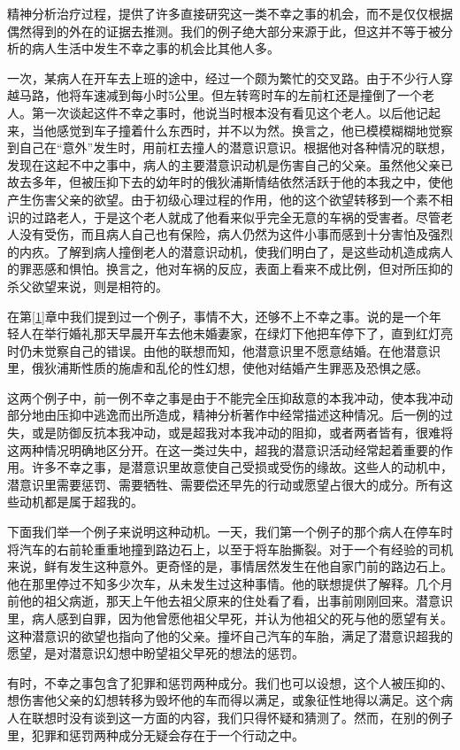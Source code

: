 \documentclass[UTF8,10pt,a4paper,openany]{book}
\begin{document}
精神分析治疗过程，提供了许多直接研究这一类不幸之事的机会，而不是仅仅根据偶然得到的外在的证据去推测。我们的例子绝大部分来源于此，但这并不等于被分析的病人生活中发生不幸之事的机会比其他人多。

一次，某病人在开车去上班的途中，经过一个颇为繁忙的交叉路。由于不少行人穿越马路，他将车速减到每小时5公里。但左转弯时车的左前杠还是撞倒了一个老人。第一次谈起这件不幸之事时，他说当时根本没有看见这个老人。以后他记起来，当他感觉到车子撞着什么东西时，并不以为然。换言之，他已模模糊糊地觉察到自己在“意外”发生时，用前杠去撞人的潜意识意识。根据他对各种情况的联想，发现在这起不中之事中，病人的主要潜意识动机是伤害自己的父亲。虽然他父亲已故去多年，但被压抑下去的幼年时的俄狄浦斯情结依然活跃于他的本我之中，使他产生伤害父亲的欲望。由于初级心理过程的作用，他的这个欲望转移到一个素不相识的过路老人，于是这个老人就成了他看来似乎完全无意的车祸的受害者。尽管老人没有受伤，而且病人自己也有保险，病人仍然为这件小事而感到十分害怕及强烈的内疚。了解到病人撞倒老人的潜意识动机，使我们明白了，是这些动机造成病人的罪恶感和惧怕。换言之，他对车祸的反应，表面上看来不成比例，但对所压抑的杀父欲望来说，则是相符的。

在第\ref{1}章中我们提到过一个例子，事情不大，还够不上不幸之事。说的是一个年轻人在举行婚礼那天早晨开车去他未婚妻家，在绿灯下他把车停下了，直到红灯亮时仍未觉察自己的错误。由他的联想而知，他潜意识里不愿意结婚。在他潜意识里，俄狄浦斯性质的施虐和乱伦的性幻想，使他对结婚产生罪恶及恐惧之感。

这两个例子中，前一例不幸之事是由于不能完全压抑敌意的本我冲动，使本我冲动部分地由压抑中逃逸而出所造成，精神分析著作中经常描述这种情况。后一例的过失，或是防御反抗本我冲动，或是超我对本我冲动的阻抑，或者两者皆有，很难将这两种情况明确地区分开。在这一类过失中，超我的潜意识活动经常起着重要的作用。许多不幸之事，是潜意识里故意使自己受损或受伤的缘故。这些人的动机中，潜意识里需要惩罚、需要牺牲、需要偿还早先的行动或愿望占很大的成分。所有这些动机都是属于超我的。

下面我们举一个例子来说明这种动机。一天，我们第一个例子的那个病人在停车时将汽车的右前轮重重地撞到路边石上，以至于将车胎撕裂。对于一个有经验的司机来说，鲜有发生这种意外。更奇怪的是，事情居然发生在他自家门前的路边石上。他在那里停过不知多少次车，从未发生过这种事情。他的联想提供了解释。几个月前他的祖父病逝，那天上午他去祖父原来的住处看了看，出事前刚刚回来。潜意识里，病人感到自罪，因为他曾愿他祖父早死，并认为他祖父的死与他的愿望有关。这种潜意识的欲望也指向了他的父亲。撞坏自己汽车的车胎，满足了潜意识超我的愿望，是对潜意识幻想中盼望祖父早死的想法的惩罚。

有时，不幸之事包含了犯罪和惩罚两种成分。我们也可以设想，这个人被压抑的、想伤害他父亲的幻想转移为毁坏他的车而得以满足，或象征性地得以满足。这个病人在联想时没有谈到这一方面的内容，我们只得怀疑和猜测了。然而，在别的例子里，犯罪和惩罚两种成分无疑会存在于一个行动之中。
\end{document}
